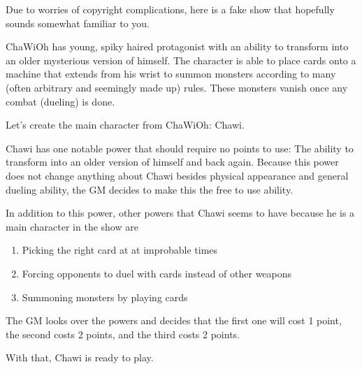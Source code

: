 \begin{flushleft}
Due to worries of copyright complications, here is a fake show that hopefully
sounds somewhat familiar to you.

ChaWiOh has young, spiky haired protagonist with an ability to transform into
an older mysterious version of himself. The character is able to place cards
onto a machine that extends from his wrist to summon monsters according to many
(often arbitrary and seemingly made up) rules. These monsters vanish once any
combat (dueling) is done.

Let's create the main character from ChaWiOh: Chawi.

Chawi has one notable power that should require no points to use: The ability
to transform into an older version of himself and back again. Because this
power does not change anything about Chawi besides physical appearance and
general dueling ability, the GM decides to make this the free to use ability.

In addition to this power, other powers that Chawi seems to have because he is
a main character in the show are

\begin{enumerate}

    \item{Picking the right card at at improbable times}
    \item{Forcing opponents to duel with cards instead of other weapons}
    \item{Summoning monsters by playing cards}

\end{enumerate}

The GM looks over the powers and decides that the first one will cost 1 point,
the second costs 2 points, and the third costs 2 points.

With that, Chawi is ready to play.

\end{flushleft}
